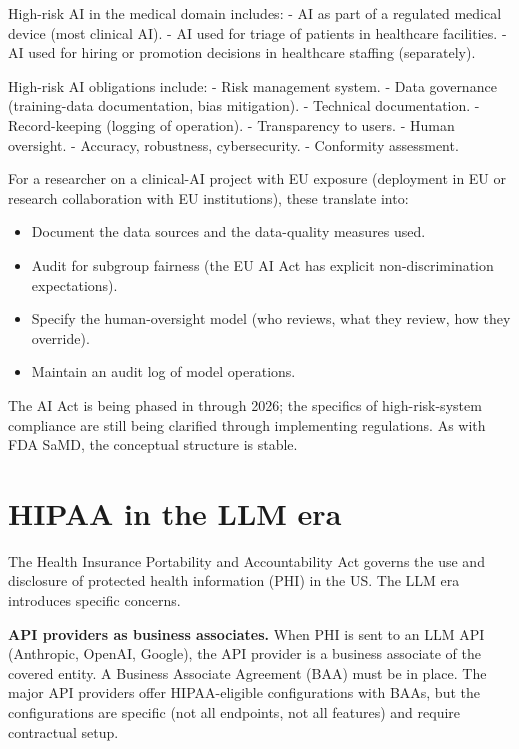 \documentclass[
  letterpaper,
  11pt]{scrbook}
\providecommand{\tightlist}{%
  \setlength{\itemsep}{0pt}\setlength{\parskip}{0pt}}
\begin{document}
High-risk AI in the medical domain includes: - AI as part of a regulated
medical device (most clinical AI). - AI used for triage of patients in
healthcare facilities. - AI used for hiring or promotion decisions in
healthcare staffing (separately).

High-risk AI obligations include: - Risk management system. - Data
governance (training-data documentation, bias mitigation). - Technical
documentation. - Record-keeping (logging of operation). - Transparency
to users. - Human oversight. - Accuracy, robustness, cybersecurity. -
Conformity assessment.

For a researcher on a clinical-AI project with EU exposure (deployment
in EU or research collaboration with EU institutions), these translate
into:

\begin{itemize}
\tightlist
\item
  Document the data sources and the data-quality measures used.
\item
  Audit for subgroup fairness (the EU AI Act has explicit
  non-discrimination expectations).
\item
  Specify the human-oversight model (who reviews, what they review, how
  they override).
\item
  Maintain an audit log of model operations.
\end{itemize}

The AI Act is being phased in through 2026; the specifics of
high-risk-system compliance are still being clarified through
implementing regulations. As with FDA SaMD, the conceptual structure is
stable.

\section{HIPAA in the LLM era}\label{hipaa-in-the-llm-era}

The Health Insurance Portability and Accountability Act governs the use
and disclosure of protected health information (PHI) in the US. The LLM
era introduces specific concerns.

\textbf{API providers as business associates.} When PHI is sent to an
LLM API (Anthropic, OpenAI, Google), the API provider is a business
associate of the covered entity. A Business Associate Agreement (BAA)
must be in place. The major API providers offer HIPAA-eligible
configurations with BAAs, but the configurations are specific (not all
endpoints, not all features) and require contractual setup.
\end{document}
